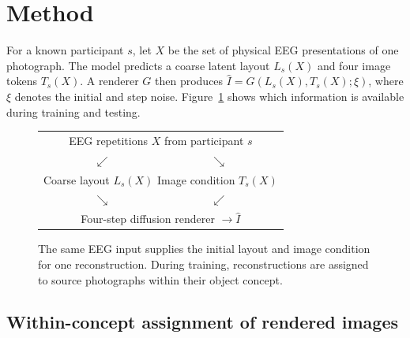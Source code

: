 \documentclass[letterpaper,10pt,conference]{IEEEtran}
\begin{document}
\section{Method}
\label{sec:method}

For a known participant \(s\), let \(X\) be the set of physical EEG presentations of one photograph. The model predicts a coarse latent layout \(L_s(X)\) and four image tokens \(T_s(X)\). A renderer \(G\) then produces \(\widehat I=G(L_s(X),T_s(X);\xi)\), where \(\xi\) denotes the initial and step noise. Figure~\ref{fig:method} shows which information is available during training and testing.

\begin{figure}[t]
\centering
\small
\begin{tabular}{@{}c@{}}
EEG repetitions \(X\) from participant \(s\) \\
\(\swarrow\hspace{9em}\searrow\) \\
Coarse layout \(L_s(X)\)
\qquad
Image condition \(T_s(X)\) \\
\(\searrow\hspace{9em}\swarrow\) \\
Four-step diffusion renderer \(\longrightarrow\widehat I\)
\end{tabular}
\caption{The same EEG input supplies the initial layout and image condition for one reconstruction. During training, reconstructions are assigned to source photographs within their object concept.}
\label{fig:method}
\end{figure}

\subsection{Within-concept assignment of rendered images}
\end{document}
